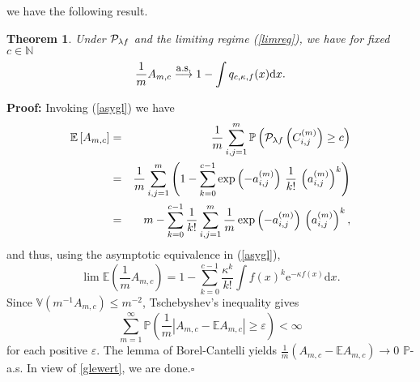 \documentclass[12pt]{article}
\def\N{\mathbb{N}}
\def\PP{\mathbb{P}}
\def\BE{\mathbb{E}}
\def\BV{\mathbb{V}}
\def\cas{\stackrel{\mbox{\small{a.s.}}}{\longrightarrow}}
\newtheorem{theorem}{\bf{Theorem}}[section]
\begin{document}
we have the following result.
%
%
\begin{theorem}\label{cons.Amc}
Under ${\cal P}_{\lambda f}$ and the limiting regime (\ref{limreg}), we have for fixed $c\in\N$
\begin{equation*}
\frac1mA_{m,c}\cas1 - \int q_{c,\kappa,f}(x) {\rm{d}} x.
\end{equation*}
\end{theorem}
%
%
{\bf Proof:}
Invoking (\ref{asygl}) we have
\begin{eqnarray*}
\BE\left[A_{m,c}\right] & = & \frac{1}{m} \sum_{i,j=1}^m \PP \left({\cal P}_{\lambda f}\left(C^{(m)}_{i,j}\right) \ge c \right)\\
& = & \frac{1}{m} \sum_{i,j=1}^m  \left( 1- \sum_{k=0}^{c-1} \exp\left(- a^{(m)}_{i,j} \right) \, \frac{1}{k!} \, \left(a^{(m)}_{i,j} \right)^k \right)\\
& = & m - \sum_{k=0}^{c-1} \frac{1}{k!} \sum_{i,j=1}^m \frac{1}{m} \exp\left(-a^{(m)}_{i,j} \right) \, \left(a^{(m)}_{i,j} \right)^k,
\end{eqnarray*}
and thus, using the asymptotic equivalence in (\ref{asygl}),
\begin{equation}\label{glewert}
\lim \BE\left(\frac1mA_{m,c}\right) = 1 - \sum_{k=0}^{c-1} \frac{\kappa^k}{k!} \int f(x)^k \mbox{e}^{-\kappa f(x)} \mbox{d} x.
\end{equation}
Since $\BV(m^{-1}A_{m,c}) \le m^{-2}$, Tschebyshev's inequality gives
$$
\sum_{m=1}^\infty \PP\left(\frac1m|A_{m,c} - \BE A_{m,c}| \ge \varepsilon \right) < \infty
$$
for each positive $\varepsilon$. The lemma of Borel-Cantelli yields $\frac1m(A_{m,c} - \BE A_{m,c}) \to 0$ $\PP$-a.s. In view of \eqref{glewert}, we are done.\hfill$\square$\\[2mm]
\end{document}
